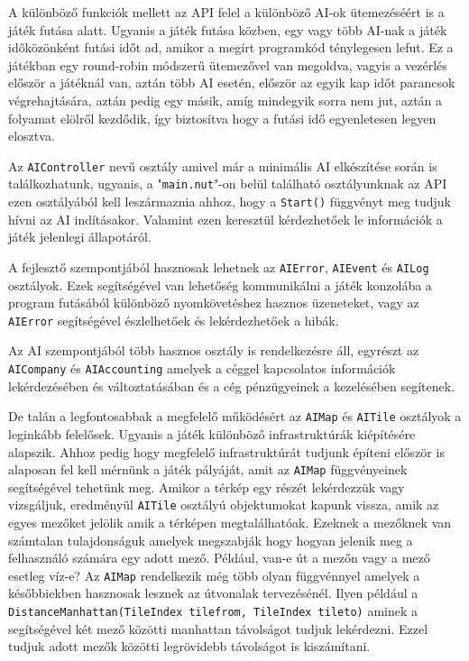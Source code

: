 A különböző funkciók mellett az API felel a különböző AI-ok ütemezéséért is a játék futása alatt. Ugyanis a játék futása közben, egy vagy több AI-nak a játék időközönként futási időt ad, amikor a megírt programkód ténylegesen lefut. Ez a játékban egy round-robin módszerű ütemezővel van megoldva, vagyis a vezérlés először a játéknál van, aztán több AI esetén, először az egyik kap időt parancsok végrehajtására, aztán pedig egy másik, amíg mindegyik sorra nem jut, aztán a folyamat elölről kezdődik, így biztosítva hogy a futási idő egyenletesen legyen elosztva. 

Az \texttt{AIController} nevű osztály amivel már a minimális AI elkészítése során is találkozhatunk, ugyanis, a "\texttt{main.nut}"-on belül található osztályunknak az API ezen osztályából kell leszármaznia ahhoz, hogy a \texttt{Start()} függvényt meg tudjuk hívni az AI indításakor. Valamint ezen keresztül kérdezhetőek le információk a játék jelenlegi állapotáról.

A fejlesztő szempontjából hasznosak lehetnek az \texttt{AIError}, \texttt{AIEvent} és \texttt{AILog} osztályok. Ezek segítségével van lehetőség kommunikálni a játék konzolába a program futásából különböző nyomkövetéshez hasznos üzeneteket, vagy az \texttt{AIError} segítségével észlelhetőek és lekérdezhetőek a hibák.

Az AI szempontjából több hasznos osztály is rendelkezésre áll, egyrészt az \\ \texttt{AICompany} és \texttt{AIAccounting} amelyek a céggel kapcsolatos információk lekérdezésében és változtatásában és a cég pénzügyeinek a kezelésében segítenek.

De talán a legfontosabbak a megfelelő működésért az \texttt{AIMap} és \texttt{AITile} osztályok a leginkább felelősek. Ugyanis a játék különböző infrastruktúrák kiépítésére alapszik. Ahhoz pedig hogy megfelelő infrastruktúrát tudjunk építeni először is alaposan fel kell mérnünk a játék pályáját, amit az \texttt{AIMap} függvényeinek segítségével tehetünk meg. Amikor a térkép egy részét lekérdezzük vagy vizsgáljuk, eredményül \texttt{AITile} osztályú objektumokat kapunk vissza, amik az egyes mezőket jelölik amik a térképen megtalálhatóak. Ezeknek a mezőknek van számtalan tulajdonságuk amelyek megszabják hogy hogyan jelenik meg a felhasználó számára egy adott mező. Például, van-e út a mezőn vagy a mező esetleg víz-e? Az \texttt{AIMap} rendelkezik még több olyan függvénnyel amelyek a későbbiekben hasznosak lesznek az útvonalak tervezésénél. Ilyen például a \texttt{DistanceManhattan(TileIndex tilefrom, TileIndex tileto)} aminek a segítségével két mező közötti manhattan távolságot tudjuk lekérdezni. Ezzel tudjuk adott mezők közötti legrövidebb távolságot is kiszámítani.

